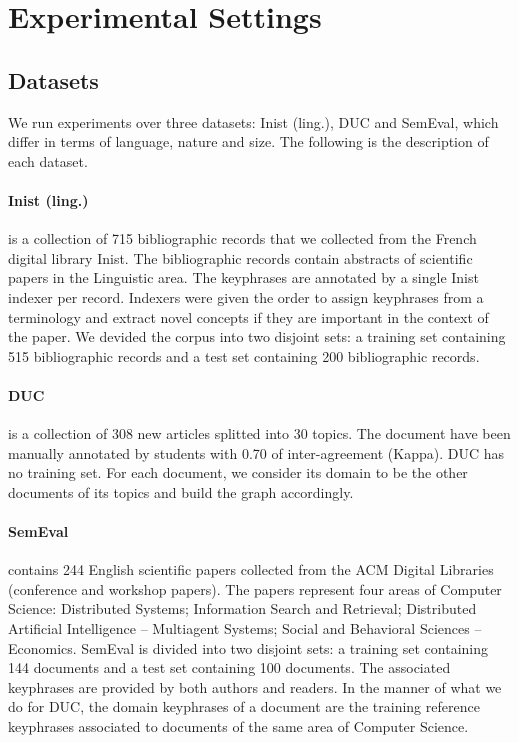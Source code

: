 \section{Experimental Settings}
\label{sec:experimental_settings}
  \subsection{Datasets}
  \label{subsec:datasets}
    We run experiments over three datasets: Inist (ling.), DUC and SemEval,
    which differ in terms of language, nature and size. The following is the
    description of each dataset.

    \paragraph{Inist (ling.)} is a collection of 715 bibliographic records that
    we collected from the French digital library Inist. The bibliographic
    records contain abstracts of scientific papers in the Linguistic area. The
    keyphrases are annotated by a single Inist indexer per record. Indexers were
    given the order to assign keyphrases from a terminology and extract novel
    concepts if they are important in the context of the paper. We devided the
    corpus into two disjoint sets: a training set containing 515 bibliographic
    records and a test set containing 200 bibliographic records.

    \paragraph{DUC~\textnormal{\cite{wan2008expandrank}}} is a collection of 308
    new articles splitted into 30 topics. The document have been manually
    annotated by students with 0.70 of inter-agreement (Kappa). DUC has no
    training set. For each document, we consider its domain to be the other
    documents of its topics and build the graph accordingly.

    \paragraph{SemEval~\textnormal{\cite{kim2010semeval}}} contains 244 English
    scientific papers collected from the ACM Digital Libraries (conference and
    workshop papers). The papers represent four areas of Computer Science:
    Distributed Systems; Information Search and Retrieval; Distributed
    Artificial Intelligence -- Multiagent Systems; Social and Behavioral
    Sciences -- Economics. SemEval is divided into two disjoint sets: a training
    set containing 144 documents and a test set containing 100 documents. The
    associated keyphrases are provided by both authors and readers. In the
    manner of what we do for DUC, the domain keyphrases of a document are the
    training reference keyphrases associated to documents of the same area of
    Computer Science.

